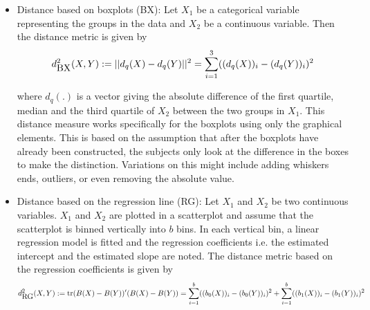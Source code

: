 \documentclass[12]{article}
\newcommand{\blue}[1]{{\color{blue} #1}}
\begin{document}
\begin{itemize}




\item Distance based on boxplots (BX): Let $X_1$ be a categorical variable representing the groups in the data and $X_2$ be a continuous variable. Then the distance metric is given by
 \[
d^2_{\hbox{BX}}(X, Y) := || d_q(X) - d_q(Y)||^2 = \sum_{i=1}^3 ((d_q(X))_i - (d_q(Y))_i)^2
\]

where $d_q(.)$ is a vector giving the absolute difference of the first quartile, median and the third quartile of $X_2$ between the two groups in $X_1$. This distance measure works specifically for the boxplots using only the graphical elements. This is based on the assumption that after the boxplots have already been constructed, the subjects only look at the difference in the boxes to make the distinction. Variations on this might include adding whiskers ends, outliers, or even removing the absolute value. 

\item Distance based on the regression line (RG): Let $X_1$ and $X_2$ be two continuous variables. $X_1$ and $X_2$ are plotted in a scatterplot and assume that the scatterplot is binned vertically into $b$ bins. In each vertical bin, a linear regression model is fitted and the regression coefficients i.e. the estimated intercept and the estimated slope are noted. The distance metric based on the regression coefficients is given by
 \[
d^2_{\hbox{RG}}(X, Y) := \hbox{tr} (B(X) - B(Y))' (B(X) - B(Y)) = \sum_{i=1}^b ((b_0(X))_i - (b_0(Y))_i)^2 + \sum_{i=1}^b ((b_1(X))_i - (b_1(Y))_i)^2
\]


\end{itemize}
\end{document}
